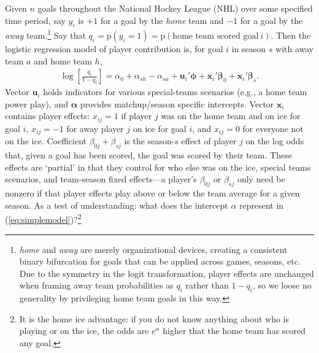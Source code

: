 Given $n$ goals throughout the National Hockey League (NHL) over some
specified time period,  say $y_i$ is $+1$ for a goal by the \textit{home} team
and $-1$ for a goal by the \textit{away} team.\footnote{{\em home} and {\em
away} are merely organizational devices, creating a consistent binary
bifurcation for goals that can be applied across games, seasons, etc. Due to
the symmetry in the logit transformation, player effects are unchanged when
framing away team probabilities as $q_i$ rather than $1-q_i$, so we loose no
generality by privileging home team goals in this way.}  Say that $q_i =
\mathrm{p}(y_i = 1) =  \mathrm{p}(\text{home~team~scored~goal}~i)$.  Then the
logistic regression model of player contribution is, for goal $i$ in season
$s$ with away team $a$ and home team $h$,  \begin{align}\label{hockeymod}
\log\left[\frac{q_{i}}{1-q_{i}}\right] = \alpha_0 + \alpha_{sh} - \alpha_{sa} +
\mathbf{u}_i'\boldsymbol{\phi} + \mathbf{x}_i'\boldsymbol{\beta}_0 +
\mathbf{x}_i'\boldsymbol{\beta}_s. \end{align}  Vector $\mathbf{u}_i$ holds
indicators for various special-teams scenarios (e.g., a home team power play),
and $\boldsymbol{\alpha}$ provides matchup/season specific intercepts. Vector
$\mathbf{x}_i$ contains player effects: $x_{ij}=1$ if player $j$ was on the
home team and on ice for goal $i$, $x_{ij}=-1$ for away player $j$ on ice for
goal $i$, and $x_{ij}=0$ for everyone not on the ice.   Coefficient
$\beta_{0j} + \beta_{sj}$ is the season-$s$ effect of player $j$ on the log
odds that, given a goal has been scored, the goal was scored by their team.
These effects are `partial' in that they control for who else was on the ice,
special teams scenarios, and team-season fixed effects---a player's
$\beta_{0j}$ or $\beta_{sj}$ only need be nonzero if that player effects play
above or below the team average for a given season.  As a test of understanding: what does the intercept
$\alpha$ represent in (\ref{eq:simplemodel})?\footnote{It is the home ice
advantage: if you do not know anything about who is playing or on the ice, the
odds are $e^{\alpha}$ higher that the home team has scored any goal.}


